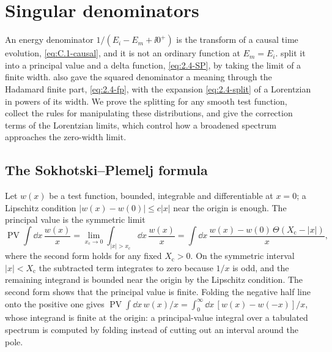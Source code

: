 \section{Singular denominators}\label{app:C.4}

An energy denominator $1/(E_i - E_m + \ii0^+)$ is the transform of a causal time evolution, \cref{eq:C.1-causal}, and it is not an ordinary function at $E_m = E_i$.  split it into a principal value and a delta function, \cref{eq:2.4-SP}, by taking the limit of a finite width.  also gave the squared denominator a meaning through the Hadamard finite part, \cref{eq:2.4-fp}, with the expansion \cref{eq:2.4-split} of a Lorentzian in powers of its width. We prove the splitting for any smooth test function, collect the rules for manipulating these distributions, and give the correction terms of the Lorentzian limits, which control how a broadened spectrum approaches the zero-width limit.

\subsection{The Sokhotski--Plemelj formula}

Let $w(x)$ be a test function, bounded, integrable and differentiable at $x = 0$; a Lipschitz condition $|w(x) - w(0)| \le c|x|$ near the origin is enough. The principal value is the symmetric limit
\begin{equation}
  \operatorname{PV}\!\int\dd x\,\frac{w(x)}{x} = \lim_{x_{\mathrm{c}}\to0}\int_{|x| > x_{\mathrm{c}}}\dd x\,\frac{w(x)}{x} = \int\dd x\,\frac{w(x) - w(0)\,\Theta(X_{\mathrm{c}} - |x|)}{x} ,
  \label{eq:C.4-PV}
\end{equation}
where the second form holds for any fixed $X_{\mathrm{c}} > 0$. On the symmetric interval $|x| < X_{\mathrm{c}}$ the subtracted term integrates to zero because $1/x$ is odd, and the remaining integrand is bounded near the origin by the Lipschitz condition. The second form shows that the principal value is finite. Folding the negative half line onto the positive one gives $\operatorname{PV}\!\int\dd x\,w(x)/x = \int_0^\infty\dd x\,[w(x) - w(-x)]/x$, whose integrand is finite at the origin: a principal-value integral over a tabulated spectrum is computed by folding instead of cutting out an interval around the pole.


